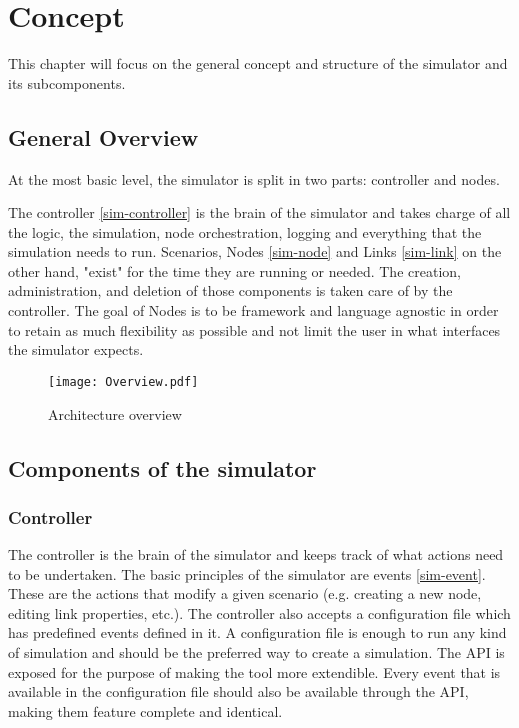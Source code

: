 \chapter{Concept}

This chapter will focus on the general concept and structure of the simulator and its subcomponents.

\section{General Overview}

At the most basic level, the simulator is split in two parts: controller and nodes.

The controller \ref{sim-controller} is the brain of the simulator and takes charge of all the logic, the simulation, node orchestration, logging and everything that the simulation needs to run.
Scenarios, Nodes \ref{sim-node} and Links \ref{sim-link} on the other hand, "exist" for the time they are running or needed. The creation, administration, and deletion of those components is taken care of by the controller.
The goal of Nodes is to be framework and language agnostic in order to retain as much flexibility as possible and not limit the user in what interfaces the simulator expects.

\begin{figure}[h]
  \label{fig:concept-overview}
  \caption{Architecture overview}
  \centering
  \texttt{[image: Overview.pdf]}
\end{figure}

\section{Components of the simulator}

\subsection{Controller \label{sim-controller}}

The controller is the brain of the simulator and keeps track of what actions need to be undertaken.
The basic principles of the simulator are events \ref{sim-event}.
These are the actions that modify a given scenario (e.g. creating a new node, editing link properties, etc.).
The controller also accepts a configuration file which has predefined events defined in it.
A configuration file is enough to run any kind of simulation and should be the preferred way to create a simulation. The API is exposed for the purpose of making the tool more extendible. Every event that is available in the configuration file should also be available through the API, making them feature complete and identical.

